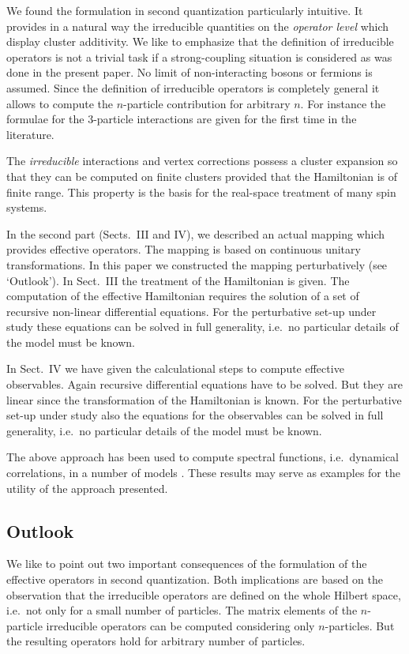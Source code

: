 We found the formulation in second quantization particularly intuitive.
It provides in a natural way the irreducible quantities on the 
{\it operator level} which display cluster additivity.
We like to emphasize that the definition of irreducible operators
is not a trivial task if a strong-coupling situation is considered
as was done in the present paper. No limit of non-interacting 
bosons or fermions is assumed.
Since the definition of irreducible operators is completely
general it allows to compute the $n$-particle contribution
for arbitrary $n$. For instance the formulae for the $3$-particle
interactions are given for the first time in the literature.

The {\it irreducible} interactions and vertex corrections possess
a cluster expansion so that they can be computed on finite
clusters provided that the Hamiltonian is of finite range.
This property is the basis for the real-space treatment of many spin systems.

In the second part (Sects.\ III and IV), we described 
an actual mapping which provides effective operators. The mapping
is based on continuous unitary transformations. In this
paper we constructed the mapping perturbatively (see `Outlook').
In Sect.\ III the treatment of the Hamiltonian is given. The computation 
of the effective Hamiltonian requires the solution of a set of recursive
non-linear differential equations. For the perturbative set-up
under study these equations can be solved in full generality, i.e.\
no particular details of the model must be known.

In  Sect.\ IV we have given the calculational steps to compute 
effective observables. Again recursive differential equations
have to be solved. But they are linear since the 
transformation of the Hamiltonian is known. For the perturbative set-up
under study also the equations for the observables
can be solved in full generality, i.e.\
no particular details of the model must be known.

The above approach has been used to compute spectral
functions, i.e.\ dynamical correlations, in a number of models 
\cite{uhrig98c,knett00b,knett00a,stein97,knett01b,schmi01,mulle00a,schmi03a,knett02,gruni02b,knett00e,knett01a,breni02}.
These results may serve as examples for the utility of the approach presented.


\subsection{Outlook}
We like to point out two important consequences of the formulation 
of the effective operators in second quantization.
Both implications are based on the observation that the irreducible
operators are defined on the whole Hilbert space, i.e.\ not only
for a small number of particles. The matrix elements of
the $n$-particle irreducible operators can be computed considering
only $n$-particles. But the resulting operators hold for arbitrary
number of particles.

